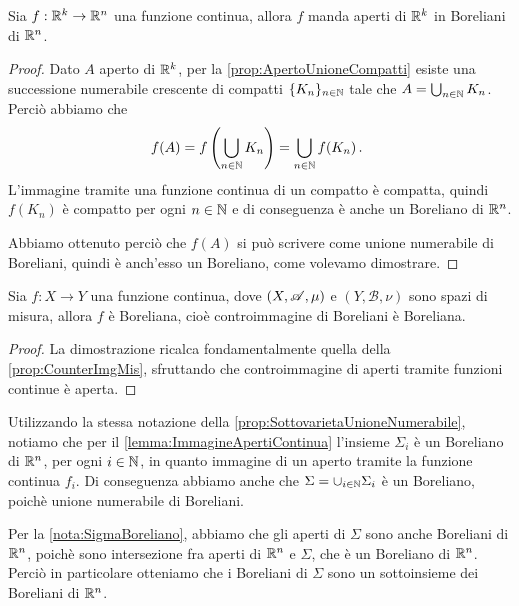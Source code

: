 \begin{lemma}\label{lemma:ImmagineApertiContinua}
	Sia $f:\mathbb R^k\to\mathbb R^n$ una funzione continua, allora $f$ manda aperti di $\mathbb R^k$ in Boreliani di $\mathbb R^n$.
\end{lemma}
\begin{proof}
	Dato $A$ aperto di $\mathbb R^k$, per la \cref{prop:ApertoUnioneCompatti} esiste una successione numerabile crescente di compatti $\{K_n\}_{n\in\mathbb N}$ tale che $A=\bigcup_{n\in\mathbb N}K_n$. Perciò abbiamo che
	\begin{equation*}
		f(A)=f\left(\bigcup_{n\in\mathbb N}K_n\right)=\bigcup_{n\in\mathbb N}f(K_n)\, \text{. }
	\end{equation*}
	L'immagine tramite una funzione continua di un compatto è compatta, quindi $f(K_n)$ è compatto per ogni $n\in\mathbb N$ e di conseguenza è anche un Boreliano di $\mathbb R^n$.
	
	Abbiamo ottenuto perciò che $f(A)$ si può scrivere come unione numerabile di Boreliani, quindi è anch'esso un Boreliano, come volevamo dimostrare.	
\end{proof}

\begin{lemma}\label{lemma:ContinuaImplicaBoreliana}
	Sia $f:X\to Y$ una funzione continua, dove $(X,\mathscr A,\mu)$ e $(Y,\mathscr{B},\nu)$ sono spazi di misura, allora $f$ è Boreliana, cioè controimmagine di Boreliani è Boreliana. 
\end{lemma}
\begin{proof}
	La dimostrazione ricalca fondamentalmente quella della \cref{prop:CounterImgMis}, sfruttando che controimmagine di aperti tramite funzioni continue è aperta.
\end{proof}

\begin{remark}\label{nota:SigmaBoreliano}
	Utilizzando la stessa notazione della \cref{prop:SottovarietaUnioneNumerabile}, notiamo che per il \cref{lemma:ImmagineApertiContinua} l'insieme $\Sigma_i$ è un Boreliano di $\mathbb R^n$, per ogni $i\in\mathbb N$, in quanto immagine di un aperto tramite la funzione continua $f_i$. Di conseguenza abbiamo anche che $\Sigma=\cup_{i\in\mathbb N}\Sigma_i$ è un Boreliano, poichè unione numerabile di Boreliani.  
\end{remark}

\begin{remark}\label{nota:BorelianiSottovarieta}
	Per la \cref{nota:SigmaBoreliano}, abbiamo che gli aperti di $\Sigma$ sono anche Boreliani di $\mathbb R^n$, poichè sono intersezione fra aperti di $\mathbb R^n$ e $\Sigma$, che è un Boreliano di $\mathbb R^n$. Perciò in particolare otteniamo che i Boreliani di $\Sigma$ sono un sottoinsieme dei Boreliani di $\mathbb R^n$.
\end{remark}

